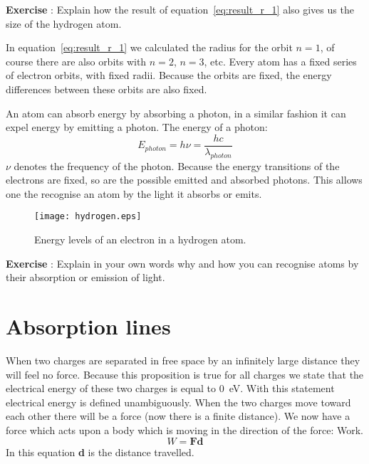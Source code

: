 \begin{shaded} \textbf{Exercise \theExercise {}} : Explain how the result of equation~\ref{eq:result_r_1} also gives us the size of the hydrogen atom.\end{shaded}

In equation~\ref{eq:result_r_1} we calculated the radius for the orbit $n=1$, of course there are also orbits with $n=2$, $n=3$, etc. Every atom has a fixed series of electron orbits, with fixed radii. Because the orbits are fixed, the energy differences between these orbits are also fixed.

An atom can absorb energy by absorbing a photon, in a similar fashion it can expel energy by emitting a photon. The energy of a photon:
\begin{equation}
E_{photon} = h\nu = \frac{hc}{\lambda_{photon}} \label{eq:E_photon}
\end{equation}
$\nu$ denotes the frequency of the photon. Because the energy transitions of the electrons are fixed, so are the possible emitted and absorbed photons. This allows one the recognise an atom by the light it absorbs or emits.

\begin{figure}\begin{center}
\texttt{[image: hydrogen.eps]}
\caption{Energy levels of an electron in a hydrogen atom.}\label{fig:shower_angles}
\end{center}\end{figure}

\begin{shaded} \textbf{Exercise \theExercise {}} : Explain in your own words why and how you can recognise atoms by their absorption or emission of light. \end{shaded}

\section{Absorption lines}
When two charges are separated in free space by an infinitely large distance they will feel no force. Because this proposition is true for all charges we state that the electrical energy of these two charges is equal to 0~eV. With this statement electrical energy is defined unambiguously.
When the two charges move toward each other there will be a force (now there is a finite distance). We now have a force which acts upon a body which is moving in the direction of the force: Work.
\begin{equation}
W = \textbf{F} \textbf{d}  \label{eq:work}
\end{equation}
In this equation \textbf{d} is the distance travelled.

